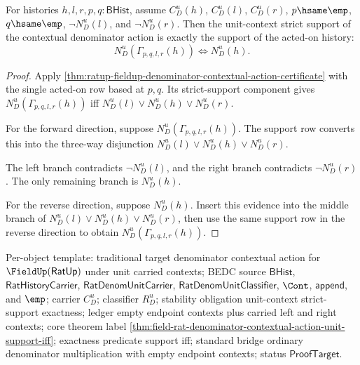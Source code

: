 \begin{theorem}
\label{thm:field-rat-denominator-contextual-action-unit-support-iff}
For histories $h,l,r,p,q:\mathsf{BHist}$, assume $C_D^u(h)$, $C_D^u(l)$,
$C_D^u(r)$, $p\hsame\emp$, $q\hsame\emp$, $\neg N_D^u(l)$, and
$\neg N_D^u(r)$. Then the
unit-context strict support of the contextual denominator action is exactly the
support of the acted-on history:
$$
N_D^u(\Gamma_{p,q,l,r}(h))
\Longleftrightarrow
N_D^u(h).
$$
\end{theorem}
\begin{proof}
Apply
\autoref{thm:ratup-fieldup-denominator-contextual-action-certificate} with the
single acted-on row based at $p,q$. Its strict-support component gives
$N_D^u(\Gamma_{p,q,l,r}(h))$ iff
$N_D^u(l)\lor N_D^u(h)\lor N_D^u(r)$.

For the forward direction, suppose
$N_D^u(\Gamma_{p,q,l,r}(h))$. The support row converts this into the three-way
disjunction $N_D^u(l)\lor N_D^u(h)\lor N_D^u(r)$.

The left branch contradicts $\neg N_D^u(l)$, and the right branch contradicts
$\neg N_D^u(r)$. The only remaining branch is $N_D^u(h)$.

For the reverse direction, suppose $N_D^u(h)$. Insert this evidence into the
middle branch of $N_D^u(l)\lor N_D^u(h)\lor N_D^u(r)$, then use the same
support row in the reverse direction to obtain
$N_D^u(\Gamma_{p,q,l,r}(h))$.
\end{proof}

Per-object template: traditional target denominator contextual action for
$\FieldUp(\mathsf{RatUp})$ under unit carried contexts; BEDC source
$\mathsf{BHist}$, $\mathsf{RatHistoryCarrier}$,
$\mathsf{RatDenomUnitCarrier}$, $\mathsf{RatDenomUnitClassifier}$, $\Cont$,
$\mathsf{append}$, and $\emp$; carrier $C_D^u$; classifier $R_D^u$; stability
obligation unit-context strict-support exactness; ledger empty endpoint contexts
plus carried left and right contexts; core theorem label
\autoref{thm:field-rat-denominator-contextual-action-unit-support-iff};
exactness predicate support iff; standard bridge ordinary denominator
multiplication with empty endpoint contexts; status $\mathsf{ProofTarget}$.

